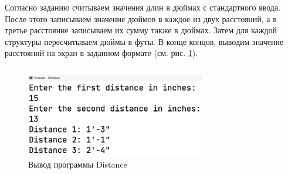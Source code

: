 \documentclass[a4paper,14pt]{extarticle}
\numberwithin{figure}{section}
\begin{document}
Согласно заданию считываем значения длин в дюймах с стандартного ввода. После этого записываем значение дюймов в каждое из двух расстояний, а в третье расстояние записываем их сумму также в дюймах. Затем для каждой структуры пересчитываем дюймы в футы. В конце концов, выводим значение расстояний на экран в заданном формате (см. рис. \ref{fig:task-3}).

\inputminted{csharp}{../Distance/Distance/Program.cs}

\begin{figure}[H]
    \centering
    \includegraphics[width=0.7\textwidth]{images/task-3.png}
    \caption{Вывод программы Distance}
    \label{fig:task-3}
\end{figure}
\end{document}
